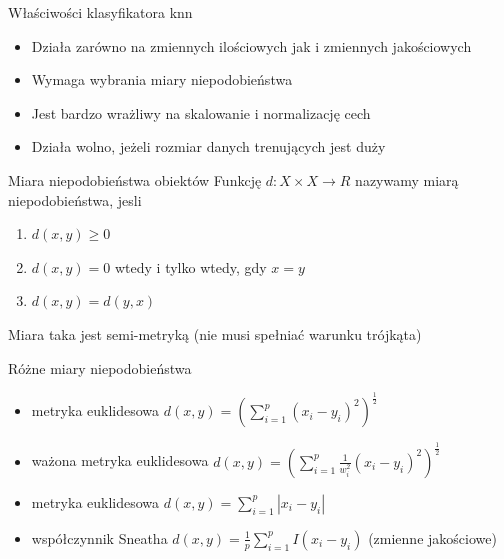 \documentclass{beamer}
\begin{document}
\begin{frame}{Właściwości klasyfikatora knn}
\begin{itemize}
   \item Działa zarówno na zmiennych ilościowych jak i zmiennych jakościowych
   \item Wymaga wybrania miary niepodobieństwa
   \item Jest bardzo wrażliwy na skalowanie i normalizację cech
   \item Działa wolno, jeżeli rozmiar danych trenujących jest duży
\end{itemize}
\end{frame}

\begin{frame}{Miara niepodobieństwa obiektów}
   Funkcję $d:X\times X \rightarrow R $ nazywamy miarą niepodobieństwa, jesli
   \begin{enumerate}
       \item $d(x,y) \geq 0$ 
       \item $d(x,y) = 0$  wtedy i tylko wtedy, gdy $x = y$
       \item $d(x,y) = d(y,x)$
   \end{enumerate}
   Miara taka jest semi-metryką (nie musi spełniać warunku trójkąta)
\end{frame}

\begin{frame}{Różne miary niepodobieństwa}
\begin{itemize}
    \item metryka euklidesowa $d(x,y) = (\sum\limits_{i=1}^{p} (x_i - y_i)^2)^{\frac{1}{2}}$
    \item ważona metryka euklidesowa $d(x,y) = (\sum\limits_{i=1}^{p} \frac{1}{w_i^2}(x_i - y_i)^2)^{\frac{1}{2}}$
    \item metryka euklidesowa $d(x,y) = \sum\limits_{i=1}^{p} \left| x_i - y_i\right|$
    \item współczynnik Sneatha $d(x,y) = \frac{1}{p} \sum\limits_{i=1}^{p} I \left( x_i - y_i\right)$ (zmienne jakościowe)
\end{itemize}
\end{frame}
\end{document}
